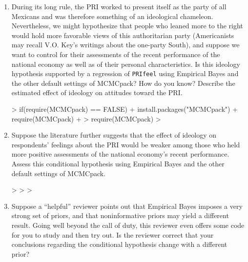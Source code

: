 \documentclass[12pt]{article}
\begin{document}
\begin{enumerate}

\item During its long rule, the PRI worked to present itself as the party of all Mexicans and was therefore something of an ideological chameleon.  Nevertheless, we might hypothesize that people who leaned more to the right would hold more favorable views of this authoritarian party (Americanists may recall V.O. Key's writings about the one-party South), and suppose we want to control for their assessments of the recent performance of the national economy as well as of their personal characteristics.  Is this ideology hypothesis supported by a regression of \texttt{PRIfeel} using Empirical Bayes and the other default settings of MCMCpack?  How do you know?  Describe the estimated effect of ideology on attitudes toward the PRI.  \\

\begin{Schunk}
\begin{Sinput}
> if(require(MCMCpack) == FALSE) {
+     install.packages("MCMCpack")
+     require(MCMCpack)
+ }
> require(MCMCpack)
> 
\end{Sinput}
\end{Schunk}


\item Suppose the literature further suggests that the effect of ideology on respondents' feelings about the PRI would be weaker among those who held more positive assessments of the national economy's recent performance.  Assess this conditional hypothesis using Empirical Bayes and the other default settings of MCMCpack.  \\

\begin{Schunk}
\begin{Sinput}
> 
> 
> 
\end{Sinput}
\end{Schunk}


\item Suppose a ``helpful'' reviewer points out that Empirical Bayes imposes a very strong set of priors, and that noninformative priors may yield a different result.  Going well beyond the call of duty, this reviewer even offers some code for you to study and then try out.  Is the reviewer correct that your conclusions regarding the conditional hypothesis change with a different prior?  \\


\end{enumerate}
\end{document}
